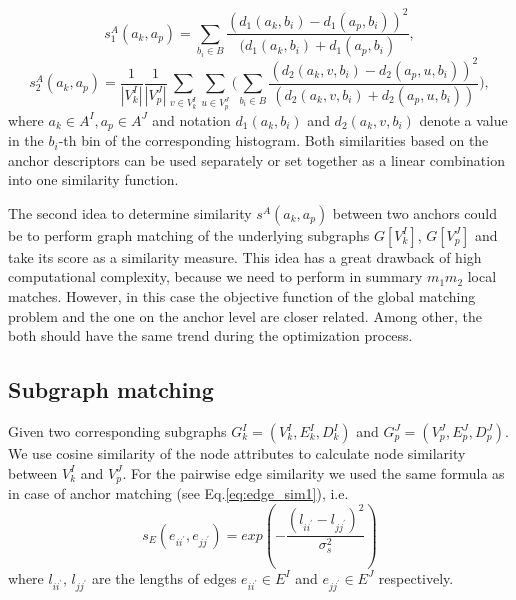 \begin{equation}
s^A_1(a_k, a_p) = \sum_{b_i\in B}\frac{(d_1(a_k,b_i)-d_1(a_p,b_i))^2}{(d_1(a_k,b_i)+d_1(a_p,b_i)},
\end{equation}
\begin{equation}
s^A_2(a_k, a_p) = \frac{1}{|V^I_k|}\frac{1}{|V^J_p|}\sum_{v\in V^I_k}\sum_{u\in V^J_p} \big(\sum_{b_i\in B}\frac{(d_2(a_k,v,b_i)-d_2(a_p,u,b_i))^2}{(d_2(a_k,v,b_i)+d_2(a_p,u,b_i))}\big),
\end{equation}
where $a_k\in A^I, a_p\in A^J$ and notation $d_1(a_k,b_i)$ and $d_2(a_k,v,b_i)$ denote a value in the $b_i$-th bin of the corresponding histogram. 
Both similarities based on the anchor descriptors can be used separately or set together as a linear combination into one similarity function.

The second idea to determine similarity $s^A(a_k, a_p)$ between two anchors could be to perform graph matching of the underlying subgraphs $G[V^I_k]$, $G[V^J_p]$ and take its score as a similarity measure. This idea has a great drawback of high computational complexity, because we need to perform in summary $m_1m_2$ local matches. However, in this case the objective function of the global matching problem and the one on the anchor level are closer related. Among other, the both should have the same trend during the optimization process.~
\subsection{Subgraph matching}
Given two corresponding subgraphs $G^I_{k}=(V^I_{k},E^I_{k},D^I_{k})$ and $G^J_{p}=(V^J_{p},E^J_{p},D^J_{p})$. We use cosine similarity of the node attributes to calculate node similarity between $V^I_{k}$ and $V^J_{p}$. For the pairwise edge similarity we used the same formula as in case of anchor matching (see Eq.\eqref{eq:edge_sim1}), i.e.\ 
\begin{equation*}
s_E(e_{ii^\prime}, e_{jj^\prime}) = exp(-\frac{(l_{ii^\prime} - l_{jj^\prime})^2}{\sigma^2_{s}})
\end{equation*}
where $l_{ii^\prime}$, $l_{jj^\prime} $ are the lengths of edges $e_{ii^\prime}\in E^I$ and $e_{jj^\prime}\in E^J$ respectively.

